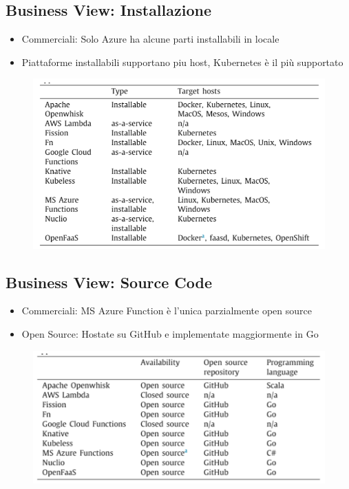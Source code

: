 \documentclass[a4paper, 12pt]{report}
\begin{document}
            \subsection{Business View: Installazione}
            \begin{itemize}
              \item Commerciali: Solo Azure ha alcune parti installabili in locale
              \item Piattaforme installabili supportano piu host, Kubernetes è il più supportato
            \end{itemize}
            \begin{figure}[h]
              \centering
              \includegraphics[scale=0.4]{Immagini/Installation.png}
            \end{figure}
            \clearpage
            \subsection{Business View: Source Code}
            \begin{itemize}
              \item Commerciali: MS Azure Function è l'unica parzialmente open source
              \item Open Source: Hostate su GitHub e implementate maggiormente in Go
            \end{itemize}
            \begin{figure}[h]
              \centering
              \includegraphics[scale=0.4]{Immagini/SourceCode.png}
            \end{figure}
\end{document}
